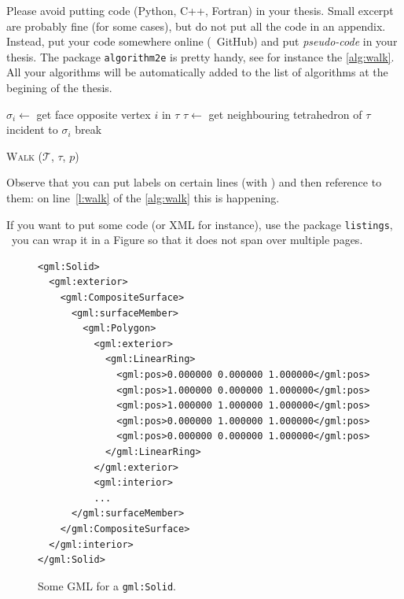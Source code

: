 Please avoid putting code (Python, C++, Fortran) in your thesis.
Small excerpt are probably fine (for some cases), but do not put all the code in an appendix.
Instead, put your code somewhere online (\eg\ GitHub) and put \emph{pseudo-code} in your thesis.
The package \texttt{algorithm2e} is pretty handy, see for instance the \autoref{alg:walk}.
All your algorithms will be automatically added to the list of algorithms at the begining of the thesis.
\begin{algorithm}
  \BlankLine
  {
    {
      $\sigma_i \leftarrow$ get face opposite vertex $i$ in $\tau$\;
      {
        $\tau \leftarrow$ get neighbouring tetrahedron of $\tau$ incident to $\sigma_i$\;
        break\;
      }
    }  
    {
    }
  }
  \caption[W\textsc{alk}]{W\textsc{alk} ($\mathcal{T}$, $\tau$, $p$)}
\label{alg:walk}
\end{algorithm}
Observe that you can put labels on certain lines (with \texttt{\nllabel{}}) and then reference to them: on line~\ref{l:walk} of the \autoref{alg:walk} this is happening.

If you want to put some code (or XML for instance), use the package \texttt{listings}, \eg\ you can wrap it in a Figure so that it does not span over multiple pages.
\begin{figure}
\begin{footnotesize}
\begin{lstlisting}
<gml:Solid>
  <gml:exterior>
    <gml:CompositeSurface>
      <gml:surfaceMember>
        <gml:Polygon>
          <gml:exterior>
            <gml:LinearRing>
              <gml:pos>0.000000 0.000000 1.000000</gml:pos>
              <gml:pos>1.000000 0.000000 1.000000</gml:pos>
              <gml:pos>1.000000 1.000000 1.000000</gml:pos>
              <gml:pos>0.000000 1.000000 1.000000</gml:pos>
              <gml:pos>0.000000 0.000000 1.000000</gml:pos>
            </gml:LinearRing>
          </gml:exterior>
          <gml:interior>
          ...
      </gml:surfaceMember>
    </gml:CompositeSurface>
  </gml:interior>
</gml:Solid>
\end{lstlisting}
\end{footnotesize}
\caption{Some GML for a \texttt{gml:Solid}.}
\label{fig:codegml}
\end{figure}

